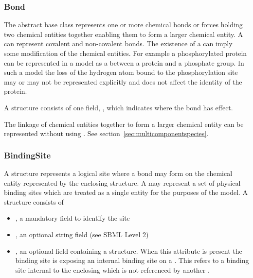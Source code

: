 \documentclass{cekarticle}
\begin{document}
\subsubsection{Bond}

The abstract base class  represents one or more chemical bonds or forces holding two chemical
entities together enabling them to form a larger chemical entity.  A  can represent
covalent and non-covalent bonds.  The existence of a  can imply some
modification of the chemical entities.  For example a phosphorylated protein can be represented
in a model as a  between a protein and a phosphate group.  In such a model
the loss of the hydrogen atom bound to the phosphorylation site may or may not be represented
explicitly and does not affect the identity of the protein.

A  structure consists of one  field,
, which indicates where the bond has effect.

The linkage of chemical entities together to form a larger chemical entity can be
represented without using .  See section~\ref{sec:multicomponentspecies}.

\subsubsection{BindingSite}

A  structure represents a logical site where a
bond may form on the chemical entity represented by the enclosing
 structure. A  may represent
a set of physical binding sites which are treated as a single
entity for the purposes of the model. A 
structure consists of

\begin{itemize}

\item {}, a mandatory  field to identify the site

\item {}, an optional string field (see SBML Level 2)

\item {}, an optional field containing
a  structure.  When this attribute is
present the binding site is exposing an internal binding site on a
. This 
refers to a binding site internal to the enclosing
 which is not referenced by another
.

\end{itemize}
\end{document}
